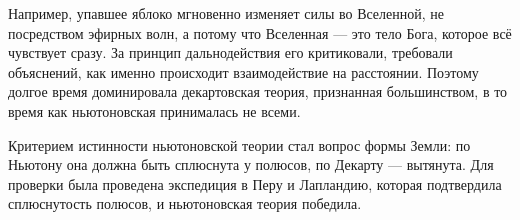 Например, упавшее яблоко мгновенно изменяет силы во Вселенной, не посредством эфирных волн, а потому что Вселенная --- это тело Бога, которое всё чувствует сразу. За принцип дальнодействия его критиковали, требовали объяснений, как именно происходит взаимодействие на расстоянии. Поэтому долгое время доминировала декартовская теория, признанная большинством, в то время как ньютоновская принималась не всеми.

Критерием истинности ньютоновской теории стал вопрос формы Земли: по Ньютону она должна быть сплюснута у полюсов, по Декарту --- вытянута. Для проверки была проведена экспедиция в Перу и Лапландию, которая подтвердила сплюснутость полюсов, и ньютоновская теория победила.









